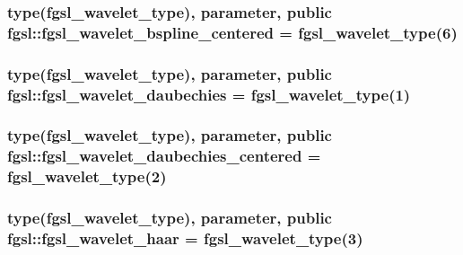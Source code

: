 \hypertarget{classfgsl_a61c7f4e05d439d135784a3d84e7f9b3a}{
\subsubsection[{fgsl\-\_\-wavelet\-\_\-bspline\-\_\-centered}]{\setlength{\rightskip}{0pt plus 5cm}type({\bf fgsl\-\_\-wavelet\-\_\-type}), parameter, public fgsl\-::fgsl\-\_\-wavelet\-\_\-bspline\-\_\-centered = {\bf fgsl\-\_\-wavelet\-\_\-type}(6)}}\label{classfgsl_a61c7f4e05d439d135784a3d84e7f9b3a}
\hypertarget{classfgsl_a67c3173fcd7991624114d64eb31bf6d8}{
\subsubsection[{fgsl\-\_\-wavelet\-\_\-daubechies}]{\setlength{\rightskip}{0pt plus 5cm}type({\bf fgsl\-\_\-wavelet\-\_\-type}), parameter, public fgsl\-::fgsl\-\_\-wavelet\-\_\-daubechies = {\bf fgsl\-\_\-wavelet\-\_\-type}(1)}}\label{classfgsl_a67c3173fcd7991624114d64eb31bf6d8}
\hypertarget{classfgsl_a26df4eaadbaa474bae2dca6abdaea27f}{
\subsubsection[{fgsl\-\_\-wavelet\-\_\-daubechies\-\_\-centered}]{\setlength{\rightskip}{0pt plus 5cm}type({\bf fgsl\-\_\-wavelet\-\_\-type}), parameter, public fgsl\-::fgsl\-\_\-wavelet\-\_\-daubechies\-\_\-centered = {\bf fgsl\-\_\-wavelet\-\_\-type}(2)}}\label{classfgsl_a26df4eaadbaa474bae2dca6abdaea27f}
\hypertarget{classfgsl_a416323050493f1845d764b5bf3599477}{
\subsubsection[{fgsl\-\_\-wavelet\-\_\-haar}]{\setlength{\rightskip}{0pt plus 5cm}type({\bf fgsl\-\_\-wavelet\-\_\-type}), parameter, public fgsl\-::fgsl\-\_\-wavelet\-\_\-haar = {\bf fgsl\-\_\-wavelet\-\_\-type}(3)}}\label{classfgsl_a416323050493f1845d764b5bf3599477}
